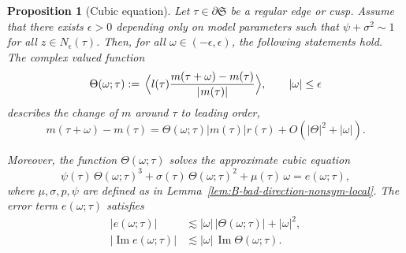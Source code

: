 \documentclass[11pt,twoside, a4paper]{article}
\numberwithin{equation}{section}
\numberwithin{figure}{section}
\theoremstyle{plain} %
\newtheorem{proposition}[theorem]{Proposition}
\theoremstyle{definition}
\theoremstyle{remark}
\newcommand{\1} {\mspace{1 mu}}
\newcommand{\2} {\mspace{2 mu}}
\newcommand{\avgB}[1]{\Big\langle #1 \Big\rangle}
\DeclareMathOperator{\im}{Im}
\begin{document}
\begin{proposition}[Cubic equation]\label{pro:Cubic equation} 
    Let $\tau \in \partial \mathfrak{S}$ be a regular edge or cusp. Assume that there exists $\epsilon>0$ depending only on model parameters such that $\psi+\sigma^2\sim 1$ for all $z\in N_\epsilon(\tau)$. Then, for all $\omega\in(-\epsilon,\epsilon)$, the following statements hold.
    The complex valued function 
    \begin{equation}\label{def.Theta}
    \Theta(\omega;\tau):=\, \avgB{l(\tau) \frac{m(\tau+\omega)-m(\tau)}{|\1m(\tau)|}},\qquad |\omega|\le\epsilon
    \end{equation}
    describes the change of $m$ around $\tau$ to leading order,
    \begin{equation}\label{eq.leading order of change}
    m(\tau+\omega)-m(\tau)
    =
    \Theta(\omega;\tau)|m(\tau)|r(\tau)+O(|\Theta|^2+|\omega|).
    \end{equation}


    Moreover, the function $\Theta(\omega;\tau)$ solves the approximate cubic equation
    \begin{equation}\label{eq:cubic-nonsym}
    \psi(\tau)\,\Theta(\omega;\tau)^3
    +\sigma(\tau)\,\Theta(\omega;\tau)^2
    +\mu(\tau)\,\omega
    =
    e(\omega;\tau),
    \end{equation}
    where \(\mu,\sigma,p,\psi\) are defined as in Lemma~\ref{lem:B-bad-direction-nonsym-local}.
    The error term $e(\omega;\tau)$ satisfies
    \begin{subequations}
    \label{eq:error-bounds-nonsym}
    \begin{align}
    |e(\omega;\tau)|
    &\lesssim
    |\omega|\,|\Theta(\omega;\tau)|+|\omega|^2,
    \\
    |\im e(\omega;\tau)|
    &\lesssim
    |\omega|\,\im \Theta(\omega;\tau).
    \end{align}
    \end{subequations}
\end{proposition}
\end{document}

